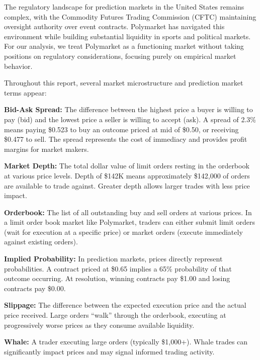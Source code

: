 The regulatory landscape for prediction markets in the United States remains complex, with the Commodity Futures Trading Commission (CFTC) maintaining oversight authority over event contracts. Polymarket has navigated this environment while building substantial liquidity in sports and political markets. For our analysis, we treat Polymarket as a functioning market without taking positions on regulatory considerations, focusing purely on empirical market behavior.

\begin{methodbox}
Throughout this report, several market microstructure and prediction market terms appear:

\textbf{Bid-Ask Spread:} The difference between the highest price a buyer is willing to pay (bid) and the lowest price a seller is willing to accept (ask). A spread of 2.3\% means paying \$0.523 to buy an outcome priced at mid of \$0.50, or receiving \$0.477 to sell. The spread represents the cost of immediacy and provides profit margins for market makers.

\textbf{Market Depth:} The total dollar value of limit orders resting in the orderbook at various price levels. Depth of \$142K means approximately \$142,000 of orders are available to trade against. Greater depth allows larger trades with less price impact.

\textbf{Orderbook:} The list of all outstanding buy and sell orders at various prices. In a limit order book market like Polymarket, traders can either submit limit orders (wait for execution at a specific price) or market orders (execute immediately against existing orders).

\textbf{Implied Probability:} In prediction markets, prices directly represent probabilities. A contract priced at \$0.65 implies a 65\% probability of that outcome occurring. At resolution, winning contracts pay \$1.00 and losing contracts pay \$0.00.

\textbf{Slippage:} The difference between the expected execution price and the actual price received. Large orders ``walk'' through the orderbook, executing at progressively worse prices as they consume available liquidity.

\textbf{Whale:} A trader executing large orders (typically \$1,000+). Whale trades can significantly impact prices and may signal informed trading activity.
\end{methodbox}


